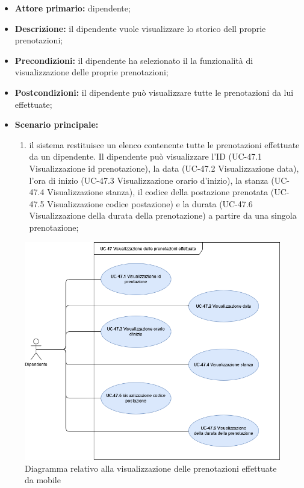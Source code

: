     \begin{itemize}
        \item \textbf{Attore primario:} dipendente;

        \item \textbf{Descrizione:} il dipendente vuole visualizzare lo storico dell proprie prenotazioni;

        \item \textbf{Precondizioni:} il dipendente ha selezionato il la funzionalità di visualizzazione delle proprie prenotazioni;

        \item \textbf{Postcondizioni:} il dipendente può visualizzare tutte le prenotazioni da lui effettuate;

        \item \textbf{Scenario principale:}
            \begin{enumerate}
                 \item il sistema restituisce un elenco contenente tutte le prenotazioni effettuate da un dipendente. Il dipendente può visualizzare l'ID (UC-47.1 Visualizzazione id prenotazione), la data (UC-47.2 Visualizzazione data), l'ora di inizio (UC-47.3 Visualizzazione orario d'inizio), la stanza (UC-47.4 Visualizzazione stanza), il codice della postazione prenotata (UC-47.5 Visualizzazione codice postazione) e la durata (UC-47.6 Visualizzazione della durata della prenotazione) a partire da una singola prenotazione;
            \end{enumerate}
    \end{itemize}

    \begin{figure}[H]
		\centering
		  \includegraphics[scale=0.40]{src/CasiDUso/immagini/VisualizzazionePrenotazioni.png}
		\caption{Diagramma relativo alla visualizzazione delle prenotazioni effettuate da mobile}
	\end{figure}


